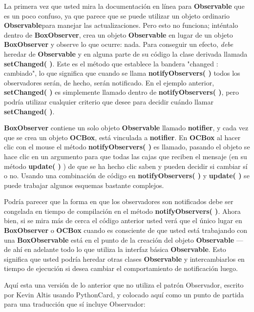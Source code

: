 La primera vez que usted mira la documentación en línea para \textbf{Observable} que es un poco confuso, ya que parece que se puede utilizar un objeto ordinario \textbf{Observable}para manejar las actualizaciones. Pero esto no funciona; inténtalo \- dentro de \textbf{BoxObserver}, crea un objeto \textbf{Observable} en lugar de un objeto \textbf{BoxObserver} y observe lo que ocurre: nada. Para conseguir un efecto, \textit{debe} heredar de \textbf{Observable} y en alguna parte de su código la clase derivada llamada \textbf{setChanged( )}. Este es el método que establece la bandera "changed : cambiado", lo que significa que cuando se llama \textbf{notifyObservers( )} todos los observadores serán, de hecho, serán notificado. En el ejemplo anterior, \textbf{setChanged( )} es simplemente llamado dentro de \textbf{notifyObservers( )}, pero podría utilizar cualquier criterio que desee para decidir cuándo llamar \textbf{setChanged( )}.      \newline

\textbf{BoxObserver} contiene un solo objeto \textbf{Observable} llamado \textbf{notifier}, y cada vez que se crea un objeto \textbf{OCBox}, está vinculada a \textbf{notifier}.  En \textbf{OCBox} al hacer clic con el mouse el método \textbf{notifyObservers( )} es llamado, pasando el objeto se hace clic en un argumento para que todas las cajas que reciben el mensaje (en su método \textbf{update( ) }) de que se ha hecho clic saben y pueden decidir si cambiar sí o no. Usando una combinación de código en \textbf{notifyObservers( )} y \textbf{update( )} se puede trabajar algunos esquemas bastante complejos.     \newline

Podría parecer que la forma en que los observadores son notificados debe ser congelada en tiempo de compilación en el método \textbf{notifyObservers( )}. Ahora bien, si se mira más de cerca el código anterior usted verá que el único lugar en \textbf{BoxObserver} o \textbf{OCBox} cuando es consciente de que usted está trabajando con una \textbf{BoxObservable} está en el punto de la creación del objeto \textbf{Observable} — de ahí en adelante todo lo que utiliza la interfaz básica \textbf{Observable}. Esto significa que usted podría heredar otras clases \textbf{Observable} y intercambiarlos en tiempo de ejecución si desea cambiar el comportamiento de notificación luego.  \newline

Aquí esta una versión de lo anterior que no utiliza el patrón Observador, escrito por Kevin Altis usando PythonCard, y colocado aquí como un punto de partida para una traducción que sí incluye Observador:  \newline

